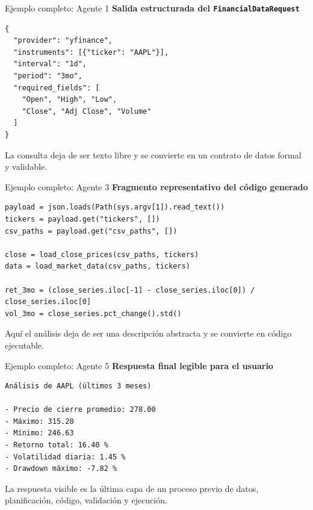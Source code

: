 \documentclass[aspectratio=169]{beamer}
\begin{document}
\begin{frame}[fragile]{Ejemplo completo: Agente 1}
\textbf{Salida estructurada del \texttt{FinancialDataRequest}}

\begin{verbatim}
{
  "provider": "yfinance",
  "instruments": [{"ticker": "AAPL"}],
  "interval": "1d",
  "period": "3mo",
  "required_fields": [
    "Open", "High", "Low",
    "Close", "Adj Close", "Volume"
  ]
}
\end{verbatim}

La consulta deja de ser texto libre y se convierte en un contrato de datos formal y validable.
\end{frame}

\begin{frame}[fragile]{Ejemplo completo: Agente 3}
\textbf{Fragmento representativo del código generado}

\begin{verbatim}
payload = json.loads(Path(sys.argv[1]).read_text())
tickers = payload.get("tickers", [])
csv_paths = payload.get("csv_paths", [])

close = load_close_prices(csv_paths, tickers)
data = load_market_data(csv_paths, tickers)

ret_3mo = (close_series.iloc[-1] - close_series.iloc[0]) / close_series.iloc[0]
vol_3mo = close_series.pct_change().std()
\end{verbatim}

Aquí el análisis deja de ser una descripción abstracta y se convierte en código ejecutable.
\end{frame}

\begin{frame}[fragile]{Ejemplo completo: Agente 5}
\textbf{Respuesta final legible para el usuario}

\begin{verbatim}
Análisis de AAPL (últimos 3 meses)

- Precio de cierre promedio: 278.00
- Máximo: 315.20
- Mínimo: 246.63
- Retorno total: 16.40 %
- Volatilidad diaria: 1.45 %
- Drawdown máximo: -7.82 %
\end{verbatim}

La respuesta visible es la última capa de un proceso previo de datos, planificación, código, validación y ejecución.
\end{frame}
\end{document}
